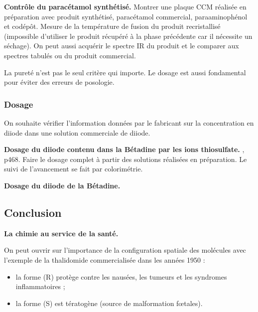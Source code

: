 \begin{experience}
\textbf{Contrôle du paracétamol synthétisé.}
Montrer une plaque CCM réalisée en préparation avec produit synthétisé, paracétamol commercial, paraaminophénol et codépôt.
Mesure de la température de fusion du produit recristallisé (impossible d'utiliser le produit récupéré à la phase précédente car il nécessite un séchage).
On peut aussi acquérir le spectre IR du produit et le comparer aux spectres tabulés ou du produit commercial.
\end{experience}

\begin{transition}
La pureté n'est pas le seul critère qui importe.
Le dosage est aussi fondamental pour éviter des erreurs de posologie.
\end{transition}

\subsubsection{Dosage}

On souhaite vérifier l'information données par le fabricant sur la concentration en diiode dans une solution commerciale de diiode.

\begin{experience}
\textbf{Dosage du diiode contenu dans la Bétadine par les ions thiosulfate.}
\cite{Dulaurans2012}, p468.
Faire le dosage complet à partir des solutions réalisées en préparation.
Le suivi de l'avancement se fait par colorimétrie.
\end{experience}

\begin{slide}
\textbf{Dosage du diiode de la Bétadine.}
\end{slide}


\subsection*{Conclusion}

\begin{slide}
\textbf{La chimie au service de la santé.}
\end{slide}

On peut ouvrir sur l'importance de la configuration spatiale des molécules avec l'exemple de la thalidomide commercialisée dans les années 1950 :
\begin{itemize}
\item la forme (R) protège contre les nausées, les tumeurs et les syndromes inflammatoires ;
\item la forme (S) est tératogène (source de malformation fœtales).
\end{itemize}

\newpage